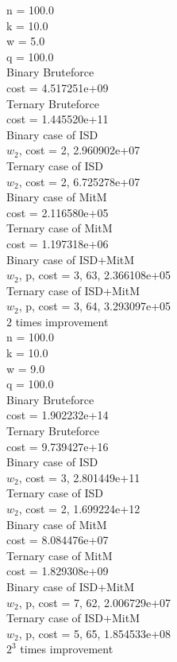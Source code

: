 \documentclass[12pt]{article}
\begin{document}
n = 100.0 \\
k = 10.0 \\
w = 5.0 \\
q = 100.0 \\
Binary Bruteforce \\
cost = 4.517251e+09 \\
Ternary Bruteforce \\
cost = 1.445520e+11 \\
Binary case of ISD \\
$w_2$, cost = 2, 2.960902e+07 \\
Ternary case of ISD \\
$w_2$, cost = 2, 6.725278e+07 \\
Binary case of MitM \\
cost = 2.116580e+05 \\
Ternary case of MitM \\
cost = 1.197318e+06 \\
Binary case of ISD+MitM \\
$w_2$, p, cost = 3, 63, 2.366108e+05 \\
Ternary case of ISD+MitM \\
$w_2$, p, cost = 3, 64, 3.293097e+05 \\
$2$ times improvement \\

n = 100.0 \\
k = 10.0 \\
w = 9.0 \\
q = 100.0 \\
Binary Bruteforce \\
cost = 1.902232e+14 \\
Ternary Bruteforce \\
cost = 9.739427e+16 \\
Binary case of ISD \\
$w_2$, cost = 3, 2.801449e+11 \\
Ternary case of ISD \\
$w_2$, cost = 2, 1.699224e+12 \\
Binary case of MitM \\
cost = 8.084476e+07 \\
Ternary case of MitM \\
cost = 1.829308e+09 \\
Binary case of ISD+MitM \\
$w_2$, p, cost = 7, 62, 2.006729e+07 \\
Ternary case of ISD+MitM \\
$w_2$, p, cost = 5, 65, 1.854533e+08 \\
$2^{3}$ times improvement
\end{document}
